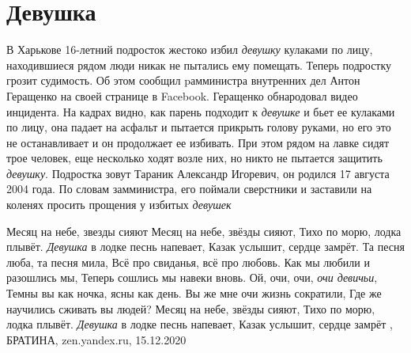  
 
 
 
 
\chapter{Девушка}
\label{sec:slova.devushka}

В Харькове 16-летний подросток жестоко избил \emph{девушку} кулаками по лицу,
находившиеся рядом люди никак не пытались ему помещать. Теперь подростку грозит
судимость.  Об этом сообщил pамминистра внутренних дел Антон Геращенко на своей
странице в Facebook.  Геращенко обнародовал видео инцидента. На кадрах видно,
как парень подходит к \emph{девушке} и бьет ее кулаками по лицу, она падает на асфальт
и пытается прикрыть голову руками, но его это не останавливает и он продолжает
ее избивать. При этом рядом на лавке сидят трое человек, еще несколько ходят
возле них, но никто не пытается защитить \emph{девушку}.  Подростка зовут  Тараник
Александр Игоревич, он родился 17 августа 2004 года. По словам замминистра, его
поймали сверстники и заставили на коленях просить прощения у избитых \emph{девушек}
  

Месяц на небе, звезды сияют
Месяц на небе, звёзды сияют,
Тихо по морю, лодка плывёт.
\emph{Девушка} в лодке песнь напевает,
Казак услышит, сердце замрёт.
Та песня люба, та песня мила,
Всё про свиданья, всё про любовь.
Как мы любили и разошлись мы,
Теперь сошлись мы навеки вновь.
Ой, очи, очи, \emph{очи девичьи},
Темны вы как ночка, ясны как день.
Вы же мне очи жизнь сократили,
Где же научились сживать вы людей?
Месяц на небе, звёзды сияют,
Тихо по морю, лодка плывёт.
\emph{Девушка} в лодке песнь напевает,
Казак услышит, сердце замрёт
, 
БРАТИНА, zen.yandex.ru, 15.12.2020

